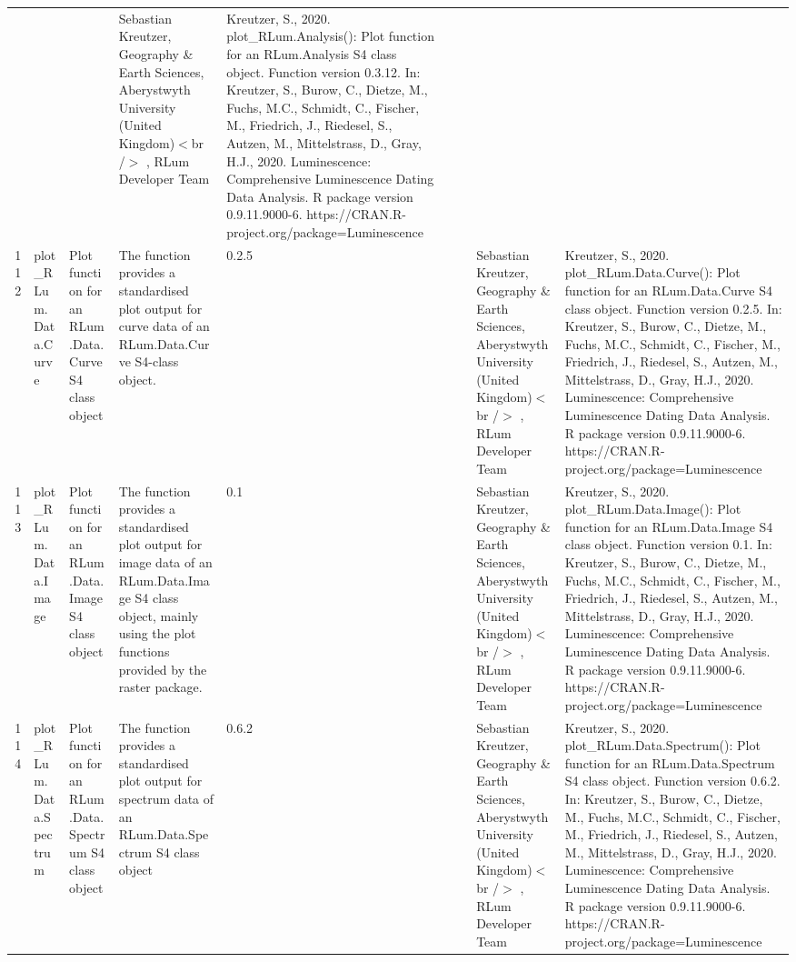 \begin{table}[ht]
\begin{tabular}{rllllllll}
 &  &  & Sebastian Kreutzer, Geography \& Earth Sciences, Aberystwyth University (United Kingdom)$<$br /$>$ , RLum Developer Team & Kreutzer, S., 2020. plot\_RLum.Analysis(): Plot function for an RLum.Analysis S4 class object. Function version 0.3.12. In: Kreutzer, S., Burow, C., Dietze, M., Fuchs, M.C., Schmidt, C., Fischer, M., Friedrich, J., Riedesel, S., Autzen, M., Mittelstrass, D., Gray, H.J., 2020. Luminescence: Comprehensive Luminescence Dating Data Analysis. R package version 0.9.11.9000-6. https://CRAN.R-project.org/package=Luminescence
 \\ 
  112 & plot\_RLum.Data.Curve & Plot function for an RLum.Data.Curve S4 class object & The function provides a standardised plot output for curve data of an RLum.Data.Curve  S4-class object. & 0.2.5
 &  &  & Sebastian Kreutzer, Geography \& Earth Sciences, Aberystwyth University (United Kingdom)$<$br /$>$ , RLum Developer Team & Kreutzer, S., 2020. plot\_RLum.Data.Curve(): Plot function for an RLum.Data.Curve S4 class object. Function version 0.2.5. In: Kreutzer, S., Burow, C., Dietze, M., Fuchs, M.C., Schmidt, C., Fischer, M., Friedrich, J., Riedesel, S., Autzen, M., Mittelstrass, D., Gray, H.J., 2020. Luminescence: Comprehensive Luminescence Dating Data Analysis. R package version 0.9.11.9000-6. https://CRAN.R-project.org/package=Luminescence
 \\ 
  113 & plot\_RLum.Data.Image & Plot function for an  RLum.Data.Image  S4 class object & The function provides a standardised plot output for image data of an RLum.Data.Image S4 class object, mainly using the plot functions provided by the  raster  package. & 0.1
 &  &  & Sebastian Kreutzer, Geography \& Earth Sciences, Aberystwyth University (United Kingdom)$<$br /$>$ , RLum Developer Team & Kreutzer, S., 2020. plot\_RLum.Data.Image(): Plot function for an RLum.Data.Image S4 class object. Function version 0.1. In: Kreutzer, S., Burow, C., Dietze, M., Fuchs, M.C., Schmidt, C., Fischer, M., Friedrich, J., Riedesel, S., Autzen, M., Mittelstrass, D., Gray, H.J., 2020. Luminescence: Comprehensive Luminescence Dating Data Analysis. R package version 0.9.11.9000-6. https://CRAN.R-project.org/package=Luminescence
 \\ 
  114 & plot\_RLum.Data.Spectrum & Plot function for an RLum.Data.Spectrum S4 class object & The function provides a standardised plot output for spectrum data of an RLum.Data.Spectrum S4 class object & 0.6.2
 &  &  & Sebastian Kreutzer, Geography \& Earth Sciences, Aberystwyth University (United Kingdom)$<$br /$>$ , RLum Developer Team & Kreutzer, S., 2020. plot\_RLum.Data.Spectrum(): Plot function for an RLum.Data.Spectrum S4 class object. Function version 0.6.2. In: Kreutzer, S., Burow, C., Dietze, M., Fuchs, M.C., Schmidt, C., Fischer, M., Friedrich, J., Riedesel, S., Autzen, M., Mittelstrass, D., Gray, H.J., 2020. Luminescence: Comprehensive Luminescence Dating Data Analysis. R package version 0.9.11.9000-6. https://CRAN.R-project.org/package=Luminescence

\end{tabular}
\end{table}
